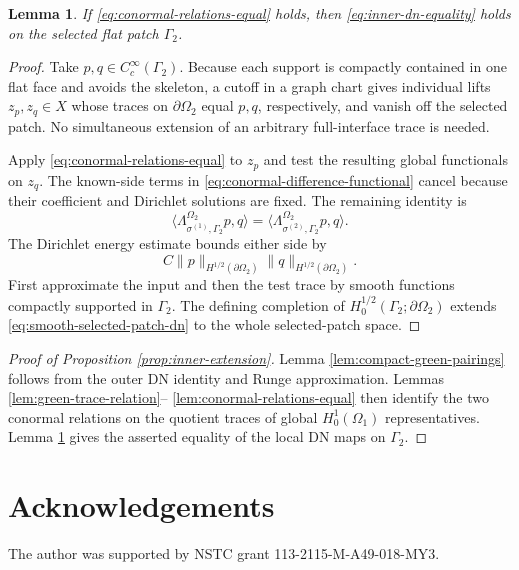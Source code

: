 \documentclass[11pt,oneside]{article}
\newtheorem{lemma}[theorem]{Lemma}
\newcommand{\DN}{\Lambda}
\begin{document}
\begin{lemma}
\label{lem:selected-patch-from-conormal}
If \eqref{eq:conormal-relations-equal} holds, then
\eqref{eq:inner-dn-equality} holds on the selected flat patch \(\Gamma_2\).
\end{lemma}

\begin{proof}
Take \(p,q\in C_c^\infty(\Gamma_2)\).  Because each support is compactly
contained in one flat face and avoids the skeleton, a cutoff in a graph chart
gives individual lifts \(z_p,z_q\in X\) whose traces on
\(\partial\Omega_2\) equal \(p,q\), respectively, and vanish off the selected
patch.  No simultaneous extension of an arbitrary full-interface trace is
needed.

Apply \eqref{eq:conormal-relations-equal} to \(z_p\) and test the resulting
global functionals on \(z_q\).  The known-side terms in
\eqref{eq:conormal-difference-functional} cancel because their coefficient and
Dirichlet solutions are fixed.  The remaining identity is
\begin{equation}
  \bigl\langle\DN^{\Omega_2}_{\sigma^{(1)},\Gamma_2}p,q\bigr\rangle
  =
  \bigl\langle\DN^{\Omega_2}_{\sigma^{(2)},\Gamma_2}p,q\bigr\rangle .
  \label{eq:smooth-selected-patch-dn}
\end{equation}
The Dirichlet energy estimate bounds either side by
\begin{equation}
  C\|p\|_{H^{1/2}(\partial\Omega_2)}
    \|q\|_{H^{1/2}(\partial\Omega_2)}.
\end{equation}
First approximate the input and then the test trace by smooth functions compactly
supported in \(\Gamma_2\).  The defining completion of
\(H^{1/2}_0(\Gamma_2;\partial\Omega_2)\) extends
\eqref{eq:smooth-selected-patch-dn} to the whole selected-patch space.
\end{proof}

\begin{proof}[Proof of Proposition \ref{prop:inner-extension}]
Lemma \ref{lem:compact-green-pairings} follows from the outer DN identity and
Runge approximation.  Lemmas \ref{lem:green-trace-relation}--
\ref{lem:conormal-relations-equal} then identify the two conormal relations on
the quotient traces of global \(H^1_0(\Omega_1)\) representatives.  Lemma
\ref{lem:selected-patch-from-conormal} gives the asserted equality of the local
DN maps on \(\Gamma_2\).
\end{proof}



\section*{Acknowledgements}
The author was supported by NSTC grant 113-2115-M-A49-018-MY3.



\end{document}
